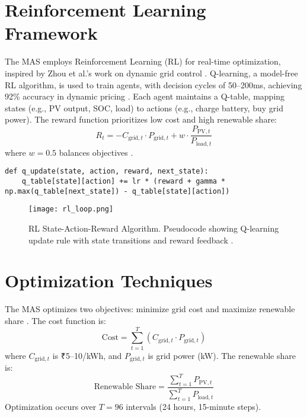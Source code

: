 \documentclass[12pt]{report}
\begin{document}
\section{Reinforcement Learning Framework}
\begin{doublespace}
The MAS employs Reinforcement Learning (RL) for real-time optimization, inspired by Zhou et al.’s work on dynamic grid control \cite{Zhou2021}. Q-learning, a model-free RL algorithm, is used to train agents, with decision cycles of 50–200ms, achieving 92\% accuracy in dynamic pricing \cite{Zhou2021}. Each agent maintains a Q-table, mapping states (e.g., PV output, SOC, load) to actions (e.g., charge battery, buy grid power). The reward function prioritizes low cost and high renewable share:
\begin{equation}
R_t = -C_{\text{grid},t} \cdot P_{\text{grid},t} + w \cdot \frac{P_{\text{PV},t}}{P_{\text{load},t}}
\end{equation}
where \( w = 0.5 \) balances objectives \cite{MNRE2023}.
\end{doublespace}
\begin{lstlisting}
def q_update(state, action, reward, next_state):
    q_table[state][action] += lr * (reward + gamma * np.max(q_table[next_state]) - q_table[state][action])
\end{lstlisting}
\begin{figure}[h]
    \centering
    \texttt{[image: rl\_loop.png]}
    \caption{RL State-Action-Reward Algorithm. Pseudocode showing Q-learning update rule with state transitions and reward feedback \cite{Zhou2021}.}
    \label{fig:rl_loop}
\end{figure}

\section{Optimization Techniques}
\begin{doublespace}
The MAS optimizes two objectives: minimize grid cost and maximize renewable share \cite{MNRE2023}. The cost function is:
\begin{equation}
\text{Cost} = \sum_{t=1}^T (C_{\text{grid},t} \cdot P_{\text{grid},t})
\end{equation}
where \( C_{\text{grid},t} \) is ₹5–10/kWh, and \( P_{\text{grid},t} \) is grid power (kW). The renewable share is:
\begin{equation}
\text{Renewable Share} = \frac{\sum_{t=1}^T P_{\text{PV},t}}{\sum_{t=1}^T P_{\text{load},t}}
\end{equation}
Optimization occurs over \( T = 96 \) intervals (24 hours, 15-minute steps).
\end{doublespace}
\end{document}
